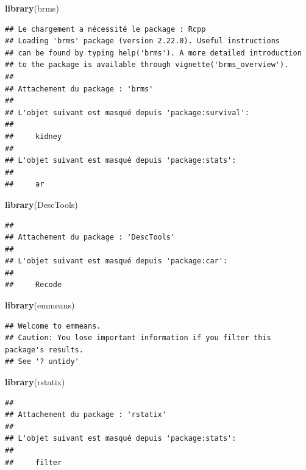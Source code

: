 \documentclass[
  french,
]{article}
\newenvironment{Shaded}{\begin{snugshade}}{\end{snugshade}}
\newcommand{\FunctionTok}[1]{\textcolor[rgb]{0.13,0.29,0.53}{\textbf{#1}}}
\newcommand{\NormalTok}[1]{#1}
\begin{document}
\begin{Shaded}
\begin{Highlighting}[]
\FunctionTok{library}\NormalTok{(brms)}
\end{Highlighting}
\end{Shaded}

\begin{verbatim}
## Le chargement a nécessité le package : Rcpp
## Loading 'brms' package (version 2.22.0). Useful instructions
## can be found by typing help('brms'). A more detailed introduction
## to the package is available through vignette('brms_overview').
## 
## Attachement du package : 'brms'
## 
## L'objet suivant est masqué depuis 'package:survival':
## 
##     kidney
## 
## L'objet suivant est masqué depuis 'package:stats':
## 
##     ar
\end{verbatim}

\begin{Shaded}
\begin{Highlighting}[]
\FunctionTok{library}\NormalTok{(DescTools)}
\end{Highlighting}
\end{Shaded}

\begin{verbatim}
## 
## Attachement du package : 'DescTools'
## 
## L'objet suivant est masqué depuis 'package:car':
## 
##     Recode
\end{verbatim}

\begin{Shaded}
\begin{Highlighting}[]
\FunctionTok{library}\NormalTok{(emmeans)}
\end{Highlighting}
\end{Shaded}

\begin{verbatim}
## Welcome to emmeans.
## Caution: You lose important information if you filter this package's results.
## See '? untidy'
\end{verbatim}

\begin{Shaded}
\begin{Highlighting}[]
\FunctionTok{library}\NormalTok{(rstatix)}
\end{Highlighting}
\end{Shaded}

\begin{verbatim}
## 
## Attachement du package : 'rstatix'
## 
## L'objet suivant est masqué depuis 'package:stats':
## 
##     filter
\end{verbatim}
\end{document}
